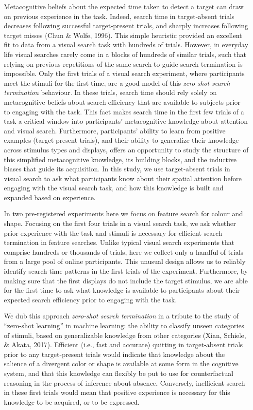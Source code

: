 \documentclass[
  english,
  man]{apa6}
\begin{document}
Metacognitive beliefs about the expected time taken to detect a target can draw on previous experience in the task. Indeed, search time in target-absent trials decreases following successful target-present trials, and sharply increases following target misses (Chun \& Wolfe, 1996). This simple heuristic provided an excellent fit to data from a visual search task with hundreds of trials. However, in everyday life visual searches rarely come in a blocks of hundreds of similar trials, such that relying on previous repetitions of the same search to guide search termination is impossible. Only the first trials of a visual search experiment, where participants meet the stimuli for the first time, are a good model of this \emph{zero-shot search termination} behaviour. In these trials, search time should rely solely on metacognitive beliefs about search efficiency that are available to subjects prior to engaging with the task. This fact makes search time in the first few trials of a task a critical window into participants' metacognitive knowledge about attention and visual search. Furthermore, participants' ability to learn from positive examples (target-present trials), and their ability to generalize their knowledge across stimulus types and displays, offers an opportunity to study the structure of this simplified metacognitive knowledge, its building blocks, and the inductive biases that guide its acquisition. In this study, we use target-absent trials in visual search to ask what participants know about their spatial attention before engaging with the visual search task, and how this knowledge is built and expanded based on experience.

In two pre-registered experiments here we focus on feature search for colour and shape. Focusing on the first four trials in a visual search task, we ask whether prior experience with the task and stimuli is necessary for efficient search termination in feature searches. Unlike typical visual search experiments that comprise hundreds or thousands of trials, here we collect only a handful of trials from a large pool of online participants. This unusual design allows us to reliably identify search time patterns in the first trials of the experiment. Furthermore, by making sure that the first displays do not include the target stimulus, we are able for the first time to ask what knowledge is available to participants about their expected search efficiency prior to engaging with the task.

We dub this approach \emph{zero-shot search termination} in a tribute to the study of \enquote{zero-shot learning} in machine learning: the ability to classify unseen categories of stimuli, based on generalizable knowledge from other categories (Xian, Schiele, \& Akata, 2017). Efficient (i.e., fast and accurate) quitting in target-absent trials prior to any target-present trials would indicate that knowledge about the salience of a divergent color or shape is available at some form in the cognitive system, and that this knowledge can flexibly be put to use for counterfactual reasoning in the process of inference about absence. Conversely, inefficient search in these first trials would mean that positive experience is necessary for this knowledge to be acquired, or to be expressed.
\end{document}
